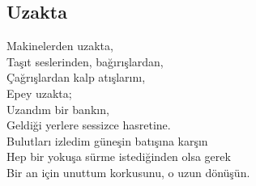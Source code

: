 \subsection{Uzakta}

Makinelerden uzakta, \\
Taşıt seslerinden, bağırışlardan, \\
Çağrışlardan kalp atışlarını, \\
Epey uzakta; \\
Uzandım bir bankın, \\
Geldiği yerlere sessizce hasretine. \\
Bulutları izledim güneşin batışına karşın \\
Hep bir yokuşa sürme istediğinden olsa gerek \\
Bir an için unuttum korkusunu, o uzun dönüşün. \\